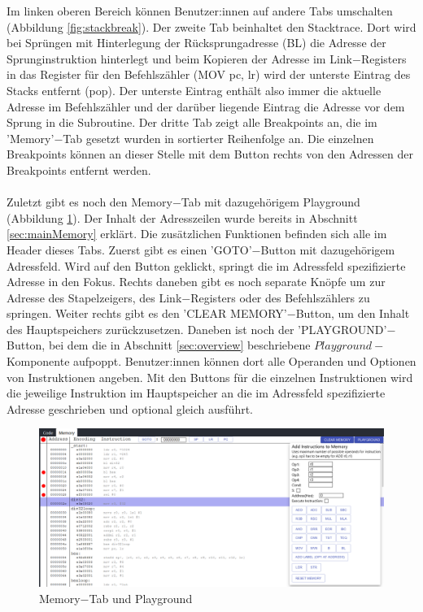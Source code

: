 \documentclass[a4paper, 11pt, onecolumn]{article}
\begin{document}
Im linken oberen Bereich können Benutzer:innen auf andere Tabs umschalten (Abbildung \ref{fig:stackbreak}). Der zweite Tab beinhaltet den Stacktrace. Dort wird bei Sprüngen mit Hinterlegung der Rücksprungadresse (BL) die Adresse der Sprunginstruktion hinterlegt und beim Kopieren der Adresse im Link$-$Registers in das Register für den Befehlszähler (MOV pc, lr) wird der unterste Eintrag des Stacks entfernt (pop). Der unterste Eintrag enthält also immer die aktuelle Adresse im Befehlszähler und der darüber liegende Eintrag die Adresse vor dem Sprung in die Subroutine. Der dritte Tab zeigt alle Breakpoints an, die im 'Memory'$-$Tab gesetzt wurden in sortierter Reihenfolge an. Die einzelnen Breakpoints können an dieser Stelle mit dem Button rechts von den Adressen der Breakpoints entfernt werden. \\ \\
Zuletzt gibt es noch den Memory$-$Tab mit dazugehörigem Playground (Abbildung \ref{fig:uimemory}). Der Inhalt der Adresszeilen wurde bereits in Abschnitt \ref{sec:mainMemory} erklärt. Die zusätzlichen Funktionen befinden sich alle im Header dieses Tabs. Zuerst gibt es einen 'GOTO'$-$Button mit dazugehörigem Adressfeld. Wird auf den Button geklickt, springt die im Adressfeld spezifizierte Adresse in den Fokus. Rechts daneben gibt es noch separate Knöpfe um zur Adresse des Stapelzeigers, des Link$-$Registers oder des Befehlszählers zu springen. Weiter rechts gibt es den 'CLEAR MEMORY'$-$Button, um den Inhalt des Hauptspeichers zurückzusetzen. Daneben ist noch der 'PLAYGROUND'$-$Button, bei dem die in Abschnitt \ref{sec:overview} beschriebene $Playground-$Komponente aufpoppt. Benutzer:innen können dort alle Operanden und Optionen von Instruktionen angeben. Mit den Buttons für die einzelnen Instruktionen wird die jeweilige Instruktion im Hauptspeicher an die im Adressfeld spezifizierte Adresse geschrieben und optional gleich ausführt.\\

\begin{figure}[!htb]
\centering
\includegraphics[width=1\textwidth]{data/uimemory}
\caption[Benutzeroberfläche $-$ Hauptspeicher und Playground]{Memory$-$Tab und Playground}
\label{fig:uimemory}
\end{figure}
\end{document}
